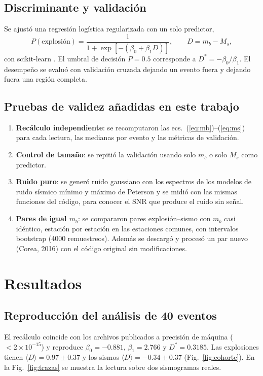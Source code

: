 \documentclass[letterpaper,12pt]{article}
\begin{document}
\subsection*{Discriminante y validación}
Se ajustó una regresión logística regularizada con un solo predictor,
\begin{equation}
  P(\text{explosión})=\frac{1}{1+\exp\left[-(\beta_0+\beta_1 D)\right]},\qquad D=m_b-M_s,
  \label{eq:logit}
\end{equation}
con scikit-learn \cite{sklearn}. El umbral de decisión $P=0.5$ corresponde a $D^\ast=-\beta_0/\beta_1$. El desempeño se evaluó con validación cruzada dejando un evento fuera y dejando fuera una región completa.

\subsection*{Pruebas de validez añadidas en este trabajo}
\begin{enumerate}
  \item \textbf{Recálculo independiente}: se recomputaron las ecs.~(\ref{eq:mb})--(\ref{eq:ms}) para cada lectura, las medianas por evento y las métricas de validación.
  \item \textbf{Control de tamaño}: se repitió la validación usando solo $m_b$ o solo $M_s$ como predictor.
  \item \textbf{Ruido puro}: se generó ruido gaussiano con los espectros de los modelos de ruido sísmico mínimo y máximo de Peterson \cite{peterson} y se midió con las mismas funciones del código, para conocer el SNR que produce el ruido sin señal.
  \item \textbf{Pares de igual $m_b$}: se compararon pares explosión--sismo con $m_b$ casi idéntico, estación por estación en las estaciones comunes, con intervalos bootstrap (4000 remuestreos). Además se descargó y procesó un par nuevo (Corea, 2016) con el código original sin modificaciones.
\end{enumerate}

\section*{Resultados}

\subsection*{Reproducción del análisis de 40 eventos}
El recálculo coincide con los archivos publicados a precisión de máquina ($<2\times10^{-15}$) y reproduce $\beta_0=-0.881$, $\beta_1=2.766$ y $D^\ast=0.3185$. Las explosiones tienen $\langle D\rangle=0.97\pm0.37$ y los sismos $\langle D\rangle=-0.34\pm0.37$ (Fig.~\ref{fig:cohorte}). En la Fig.~\ref{fig:trazas} se muestra la lectura sobre dos sismogramas reales.
\end{document}

